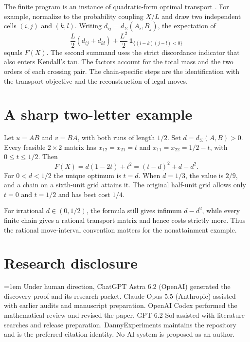 \documentclass[11pt,a4paper]{amsart}
\newcommand{\dd}{d_\Sigma}
\begin{document}
The finite program is an instance of quadratic-form optimal transport \cite{wangzhang}. For example, normalize to the probability coupling \(X/L\) and draw two independent cells \((i,j)\) and \((k,l)\). Writing \(d_{ij}=\dd(A_i,B_j)\), the expectation of
\[
\frac{L}{2}(d_{ij}+d_{kl})+
\frac{L^2}{2}\,\mathbf{1}_{\{(i-k)(j-l)<0\}}
\]
equals \(F(X)\). The second summand uses the strict discordance indicator that also enters Kendall's tau. The factors account for the total mass and the two orders of each crossing pair. The chain-specific steps are the identification with the transport objective and the reconstruction of legal moves.

\section{A sharp two-letter example}

Let \(u=AB\) and \(v=BA\), with both runs of length \(1/2\). Set \(d=\dd(A,B)>0\). Every feasible \(2\times2\) matrix has \(x_{12}=x_{21}=t\) and \(x_{11}=x_{22}=1/2-t\), with \(0\le t\le 1/2\). Then
\[
F(X)=d(1-2t)+t^2=(t-d)^2+d-d^2.
\]
For \(0<d<1/2\) the unique optimum is \(t=d\). When \(d=1/3\), the value is \(2/9\), and a chain on a sixth-unit grid attains it. The original half-unit grid allows only \(t=0\) and \(t=1/2\) and has best cost \(1/4\).

For irrational \(d\in(0,1/2)\), the formula still gives infimum \(d-d^2\), while every finite chain gives a rational transport matrix and hence costs strictly more. Thus the rational move-interval convention matters for the nonattainment example.

\section*{Research disclosure}

\begingroup{}\emergencystretch=1em\relax
Under human direction, ChatGPT Astra 6.2 (OpenAI) generated the discovery proof and its research packet. Claude Opus 5.5 (Anthropic) assisted with earlier audits and manuscript preparation. OpenAI Codex performed the mathematical review and revised the paper. GPT-6.2 Sol assisted with literature searches and release preparation. DannyExperiments maintains the repository and is the preferred citation identity. No AI system is proposed as an author.
\par\endgroup
\end{document}
